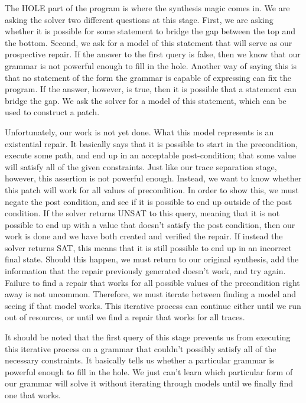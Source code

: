 \documentclass[]{article}
\begin{document}
The HOLE part of the program is where the synthesis magic comes in.  We are
asking the solver two different questions at this stage.  First, we are
asking whether it is possible for some statement to bridge the gap between
the top and the bottom.  Second, we ask for a model of this statement that
will serve as our prospective repair.  If the answer to the first query is
false, then we know that our grammar is not powerful enough to fill in the
hole.  Another way of saying this is that no statement of the form the
grammar is capable of expressing can fix the program.  If the answer,
however, is true, then it is possible that a statement can bridge the gap.
We ask the solver for a model of this statement, which can be used to
construct a patch.

Unfortunately, our work is not yet done.  What this model represents is an
existential repair.  It basically says that it is possible to start in the
precondition, execute some path, and end up in an acceptable post-condition;
that some value will satisfy all of the given constraints.  Just like our
trace separation stage, however, this assertion is not powerful enough.
Instead, we want to know whether this patch will work for all values of
precondition.  In order to show this, we must negate the post condition, and
see if it is possible to end up outside of the post condition.  If the
solver returns UNSAT to this query, meaning that it is not possible to end
up with a value that doesn't satisfy the post condition, then our work is
done and we have both created and verified the repair.  If instead the
solver returns SAT, this means that it is still possible to end up in an
incorrect final state.  Should this happen, we must return to our original
synthesis, add the information that the repair previously generated doesn't
work, and try again.  Failure to find a repair that works for all possible
values of the precondition right away is not uncommon.  Therefore, we must
iterate between finding a model and seeing if that model works.  This
iterative process can continue either until we run out of resources, or
until we find a repair that works for all traces.

It should be noted that the first query of this stage prevents us from
executing this iterative process on a grammar that couldn't possibly satisfy
all of the necessary constraints.  It basically tells us whether a
particular grammar is powerful enough to fill in the hole.  We just can't
learn which particular form of our grammar will solve it without iterating
through models until we finally find one that works.
\end{document}
